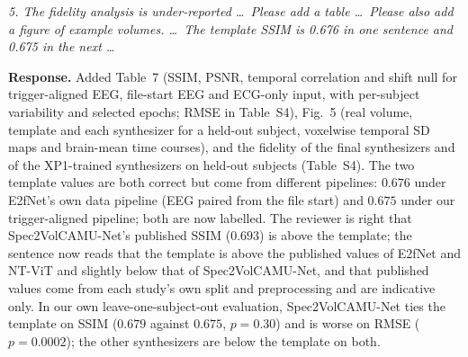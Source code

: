 \documentclass[11pt]{article}
\newcommand{\rc}[1]{\par\medskip\noindent\textit{#1}\par\smallskip}
\newcommand{\resp}{\noindent\textbf{Response.} }
\begin{document}
\rc{5. The fidelity analysis is under-reported \ldots\ Please add a table \ldots\ Please also add a figure of example volumes. \ldots\ The template SSIM is 0.676 in one sentence and 0.675 in the next \ldots}
\resp Added Table~7 (SSIM, PSNR, temporal correlation and shift null for trigger-aligned EEG, file-start EEG and ECG-only input, with per-subject variability and selected epochs; RMSE in Table~S4), Fig.~5 (real volume, template and each synthesizer for a held-out subject, voxelwise temporal SD maps and brain-mean time courses), and the fidelity of the final synthesizers and of the XP1-trained synthesizers on held-out subjects (Table~S4). The two template values are both correct but come from different pipelines: $0.676$ under E2fNet's own data pipeline (EEG paired from the file start) and $0.675$ under our trigger-aligned pipeline; both are now labelled. The reviewer is right that Spec2VolCAMU-Net's published SSIM ($0.693$) is above the template; the sentence now reads that the template is above the published values of E2fNet and NT-ViT and slightly below that of Spec2VolCAMU-Net, and that published values come from each study's own split and preprocessing and are indicative only. In our own leave-one-subject-out evaluation, Spec2VolCAMU-Net ties the template on SSIM ($0.679$ against $0.675$, $p=0.30$) and is worse on RMSE ($p=0.0002$); the other synthesizers are below the template on both.
\end{document}
